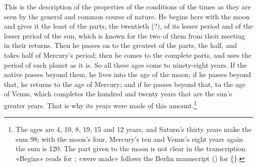 \documentclass[11pt]{article}
\begin{document}
\par This is the description of the properties of the conditions of the times as they are seen by the general and common course of nature. He begins here with the moon and gives it the least of the parts, the twentieth (?), of its lesser period and of the lesser period of the sun, which is known for the two of them from their meeting in their returns. Then he passes on to the greatest of the parts, the half, and takes half of Mercury's period; then he comes to the complete parts, and uses the period of each planet as it is. So all these ages come to ninety-eight years. If the native passes beyond them, he lives into the age of the moon; if he passes beyond that, he returns to the age of Mercury; and if he passes beyond that, to the age of Venus, which completes the hundred and twenty years that are the sun's greater years. That is why its years were made of this amount.\footnote{The ages are 4, 10, 8, 19, 15 and 12 years, and Saturn's thirty years make the sum 98; with the moon's four, Mercury's ten and Venus's eight years again the sum is 120. The part given to the moon is not clear in the transcription. «Begins» reads  for ; «were made» follows the Berlin manuscript () for \{\}.}\par
\end{document}
